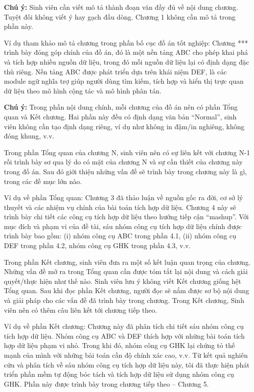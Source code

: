 \documentclass[../Main.tex]{subfiles}
\begin{document}
\textbf{Chú ý:}
Sinh viên cần viết mô tả thành đoạn văn đầy đủ về nội dung chương.
Tuyệt đối không viết ý hay gạch đầu dòng.
Chương 1 không cần mô tả trong phần này.

Ví dụ tham khảo mô tả chương trong phần bố cục đồ án tốt nghiệp: Chương *** trình bày đóng góp chính của đồ án, đó là một nền tảng ABC cho phép khai phá và tích hợp nhiều nguồn dữ liệu, trong đó mỗi nguồn dữ liệu lại có định dạng đặc thù riêng.
Nền tảng ABC được phát triển dựa trên khái niệm DEF, là các module ngữ nghĩa trợ giúp người dùng tìm kiếm, tích hợp và hiển thị trực quan dữ liệu theo mô hình cộng tác và mô hình phân tán.

\textbf{Chú ý:}
Trong phần nội dung chính, mỗi chương của đồ án nên có phần Tổng quan và Kết chương.
Hai phần này đều có định dạng văn bản “Normal”, sinh viên không cần tạo định dạng riêng, ví dụ như không in đậm/in nghiêng, không đóng khung, v.v.

Trong phần Tổng quan của chương N, sinh viên nên có sự liên kết với chương N-1 rồi trình bày sơ qua lý do có mặt của chương N và sự cần thiết của chương này trong đồ án.
Sau đó giới thiệu những vấn đề sẽ trình bày trong chương này là gì, trong các đề mục lớn nào.

Ví dụ về phần Tổng quan: Chương 3 đã thảo luận về nguồn gốc ra đời, cơ sở lý thuyết và các nhiệm vụ chính của bài toán tích hợp dữ liệu.
Chương 4 này sẽ trình bày chi tiết các công cụ tích hợp dữ liệu theo hướng tiếp cận “mashup”.
Với mục đích và phạm vi của đề tài, sáu nhóm công cụ tích hợp dữ liệu chính được trình bày bao gồm: (i) nhóm công cụ ABC trong phần 4.1, (ii) nhóm công cụ DEF trong phần 4.2, nhóm công cụ GHK trong phần 4.3, v.v.

Trong phần Kết chương, sinh viên đưa ra một số kết luận quan trọng của chương.
Những vấn đề mở ra trong Tổng quan cần được tóm tắt lại nội dung và cách giải quyết/thực hiện như thế nào.
Sinh viên lưu ý không viết Kết chương giống hệt Tổng quan.
Sau khi đọc phần Kết chương, người đọc sẽ nắm được sơ bộ nội dung và giải pháp cho các vấn đề đã trình bày trong chương.
Trong Kết chương, Sinh viên nên có thêm câu liên kết tới chương tiếp theo.

Ví dụ về phần Kết chương: Chương này đã phân tích chi tiết sáu nhóm công cụ tích hợp dữ liệu.
Nhóm công cụ ABC và DEF thích hợp với những bài toán tích hợp dữ liệu phạm vi nhỏ.
Trong khi đó, nhóm công cụ GHK lại chứng tỏ thế mạnh của mình với những bài toán cần độ chính xác cao, v.v.
Từ kết quả nghiên cứu và phân tích về sáu nhóm công cụ tích hợp dữ liệu này, tôi đã thực hiện phát triển phần mềm tự động bóc tách và tích hợp dữ liệu sử dụng nhóm công cụ GHK.
Phần này được trình bày trong chương tiếp theo – Chương 5.
\end{document}
